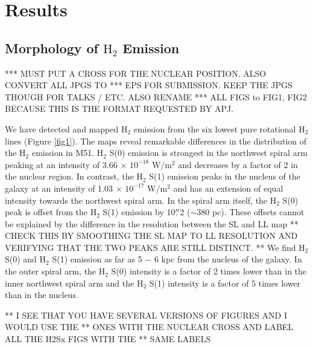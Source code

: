 \documentclass[manuscript]{aastex}
\begin{document}
\section{Results}

\subsection{Morphology of $\mathrm{H_2}$ Emission}

*** MUST PUT A CROSS FOR THE NUCLEAR POSITION.  ALSO CONVERT ALL JPGS TO
*** EPS FOR SUBMISSION.  KEEP THE JPGS THOUGH FOR TALKS / ETC.  ALSO RENAME 
*** ALL FIGS to FIG1, FIG2 BECAUSE THIS IS THE FORMAT REQUESTED BY APJ.

We have detected and mapped $\mathrm{H_2}$ emission from the six
lowest pure rotational $\mathrm{H_2}$ lines (Figure \ref{fig1}).  The
maps reveal remarkable differences in the distribution of the
$\mathrm{H_2}$ emission in M51.  $\mathrm{H_2}$ S(0) emission is
strongest in the northwest spiral arm peaking at an intensity of 3.66
$\times$ $\mathrm{10^{-18}}$ $\mathrm{W/m^2}$ and decreases by a
factor of 2 in the nuclear region.  In contrast, the $\mathrm{H_2}$
S(1) emission peaks in the nucleus of the galaxy at an intensity of
1.03 $\times$ $\mathrm{10^{-17}}$ $\mathrm{W/m^2}$ and has an
extension of equal intensity towards the northwest spiral arm.  In the
spiral arm itself, the $\mathrm{H_2}$ S(0) peak is offset from the
$\mathrm{H_2}$ S(1) emission by 10$\mbox{$.\!\!^{\prime\prime}$}$2 ($\sim$380 pc).  These
offsets cannot be explained by the difference in the resolution
between the SL and LL map ** CHECK THIS BY SMOOTHING THE SL MAP TO LL
RESOLUTION AND VERIFYING THAT THE TWO PEAKS ARE STILL DISTINCT. ** We
find $\mathrm{H_2}$ S(0) and $\mathrm{H_2}$ S(1) emission as far as 5
$-$ 6 kpc from the nucleus of the galaxy.  In the outer spiral arm,
the $\mathrm{H_2}$ S(0) intensity is a factor of 2 times lower than in
the inner northwest spiral arm and the $\mathrm{H_2}$ S(1) intensity
is a factor of 5 times lower than in the nucleus.

** I SEE THAT YOU HAVE SEVERAL VERSIONS OF FIGURES AND I WOULD USE THE
** ONES WITH THE NUCLEAR CROSS AND LABEL ALL THE H2Sx FIGS WITH THE
** SAME LABELS
 
\end{document}
